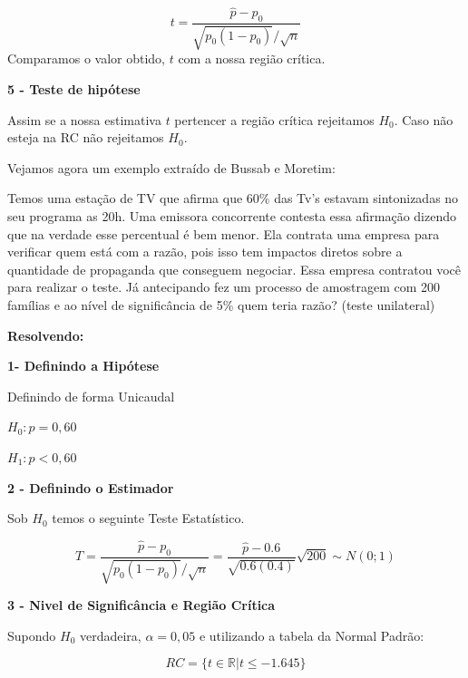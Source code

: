 \documentclass[
  letterpaper,
  DIV=11,
  numbers=noendperiod]{scrartcl}
\begin{document}
\[t=\frac{\hat{p}-p_0}{\sqrt{p_0(1-p_0)}/\sqrt{n}}\] Comparamos o valor
obtido, \(t\) com a nossa região crítica.

\vspace{0.5cm}

\textbf{5 - Teste de hipótese}

Assim se a nossa estimativa \(t\) pertencer a região crítica rejeitamos
\(H_0\). Caso não esteja na RC não rejeitamos \(H_0\).

Vejamos agora um exemplo extraído de Bussab e Moretim:

\begin{exemplo}

Temos uma estação de TV que afirma que \(60\%\) das Tv's estavam
sintonizadas no seu programa as 20h. Uma emissora concorrente contesta
essa afirmação dizendo que na verdade esse percentual é bem menor. Ela
contrata uma empresa para verificar quem está com a razão, pois isso tem
impactos diretos sobre a quantidade de propaganda que conseguem
negociar. Essa empresa contratou você para realizar o teste. Já
antecipando fez um processo de amostragem com 200 famílias e ao nível de
significância de 5\% quem teria razão? (teste unilateral)

\end{exemplo}

\textbf{Resolvendo:}

\vspace{0.5cm}

\textbf{1- Definindo a Hipótese}

Definindo de forma Unicaudal

\(H_0: p=0,60\)

\(H_1: p<0,60\)

\vspace{0.5cm}

\textbf{2 - Definindo o Estimador}

Sob \(H_0\) temos o seguinte Teste Estatístico.

\[T=\frac{\hat{p}-p_0}{\sqrt{p_0(1-p_0)}/\sqrt{n}}=\frac{\hat{p}-0.6}{\sqrt{0.6(0.4)}}\sqrt{200} \sim N(0;1)\]

\vspace{0.5cm}

\textbf{3 - Nivel de Significância e Região Crítica}

Supondo \(H_0\) verdadeira, \(\alpha=0,05\) e utilizando a tabela da
Normal Padrão:

\[RC=\{t \in \mathbb{R} | t \leq -1.645 \}\]

\vspace{0.5cm}
\end{document}
